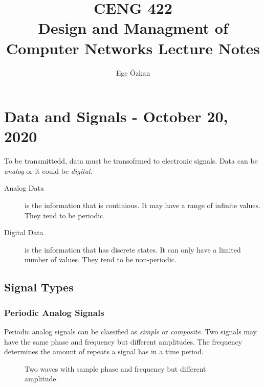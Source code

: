 \documentclass[11pt,a4paper,twoside]{book}
\author{Ege Özkan}
\title{CENG 422 \\ \large{Design and Managment of Computer Networks Lecture Notes}}
\begin{document}
\newcommand{\unsure}{\textit{?\textsuperscript{*}}}
\newcommand{\missed}{\textit{!\textsuperscript{*}}}
\maketitle
\chapter{Data and Signals - October 20, 2020}
To be transmittedd, data must be transofrmed to electronic signals. Data can be \textit{analog} or it could be \textit{digital}.

\begin{description}
\item[Analog Data] is the information that is continious. It may have a range of infinite values. They tend to be periodic.
\item[Digital Data] is the information that has discrete states. It can only have a limited number of values. They tend to be non-periodic.
\end{description}

\section{Signal Types}

\subsection{Periodic Analog Signals}

Periodic analog signals can be classified as \textit{simple} or \textit{composite}. Two signals may have the same phase and frequency but different amplitudes. The frequency determines the amount of repeats a signal has in a time period.
\begin{figure}
\caption{Two waves with sample phase and frequency but different amplitude.}
\end{figure}
\end{document}
